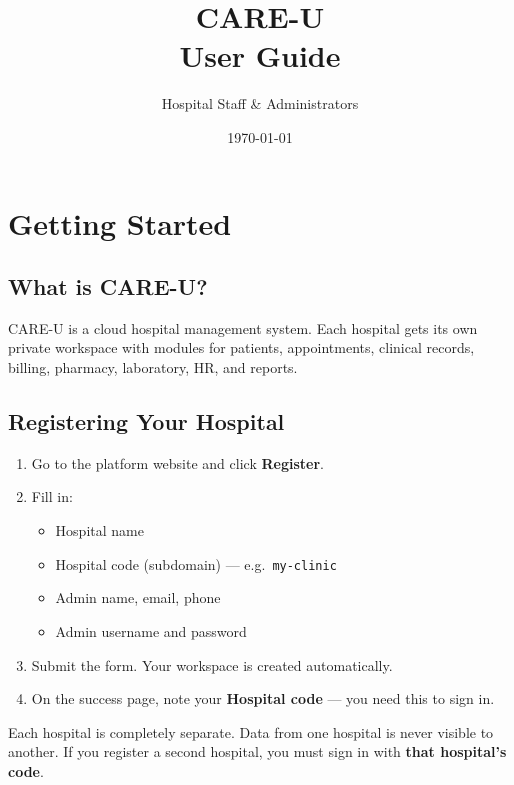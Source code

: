 \documentclass[11pt,a4paper]{report}
\title{\textbf{CARE-U}\\[0.4em]
\large User Guide}
\author{Hospital Staff \& Administrators}
\date{\today}
\begin{document}
\maketitle
\tableofcontents
\newpage

\chapter{Getting Started}

\section{What is CARE-U?}

CARE-U is a cloud hospital management system. Each hospital gets its own private workspace with modules for patients, appointments, clinical records, billing, pharmacy, laboratory, HR, and reports.

\section{Registering Your Hospital}

\begin{enumerate}
    \item Go to the platform website and click \textbf{Register}.
    \item Fill in:
    \begin{itemize}[noitemsep]
        \item Hospital name
        \item Hospital code (subdomain) --- e.g.\ \texttt{my-clinic}
        \item Admin name, email, phone
        \item Admin username and password
    \end{itemize}
    \item Submit the form. Your workspace is created automatically.
    \item On the success page, note your \textbf{Hospital code} --- you need this to sign in.
\end{enumerate}

\begin{warningbox}
Each hospital is completely separate. Data from one hospital is never visible to another. If you register a second hospital, you must sign in with \textbf{that hospital's code}.
\end{warningbox}
\end{document}
